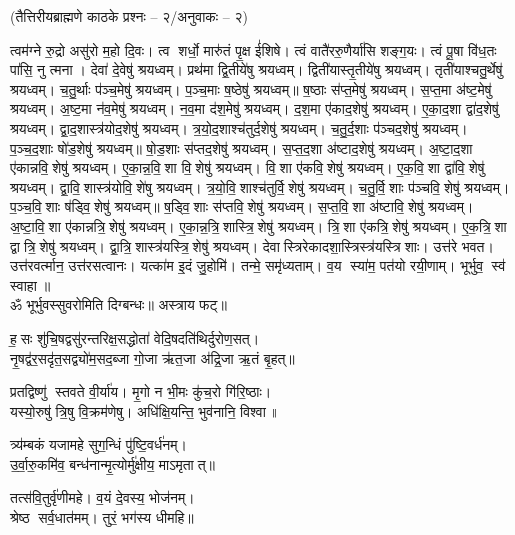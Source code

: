 \centerline{\normalsize (तैत्तिरीयब्राह्मणे काठके प्रश्नः – २/अनुवाकः – २)}
 त्वम॑ग्ने रु॒द्रो असु॑रो म॒हो दि॒वः। त्व शर्धो॒ मारु॑तं पृ॒क्ष ई॑शिषे।
 त्वं वातै॑ररु॒णैर्या॑सि शङ्ग॒यः। त्वं पू॒षा वि॑ध॒तः पा॑सि॒ नु त्मना।
 देवा॑ दे॒वेषु॑ श्रयध्वम्। प्रथ॑मा द्वि॒तीये॑षु श्रयध्वम्।
 द्विती॑यास्तृ॒तीये॑षु श्रयध्वम्। तृती॑याश्चतु॒र्थेषु॑ श्रयध्वम्।
 च॒तु॒र्थाः प॑ञ्च॒मेषु॑ श्रयध्वम्। प॒ञ्च॒माः ष॒ष्ठेषु॑ श्रयध्वम्॥
 ष॒ष्ठाः स॑प्त॒मेषु॑ श्रयध्वम्। स॒प्त॒मा अ॑ष्ट॒मेषु॑ श्रयध्वम्।
 अ॒ष्ट॒मा न॑व॒मेषु॑ श्रयध्वम्। न॒व॒मा द॑श॒मेषु॑ श्रयध्वम्।
 द॒श॒मा ए॑काद॒शेषु॑ श्रयध्वम्। ए॒का॒द॒शा द्वा॑द॒शेषु॑ श्रयध्वम्।
 द्वा॒द॒शास्त्र॑योद॒शेषु॑ श्रयध्वम्। त्र॒यो॒द॒शाश्च॑तुर्द॒शेषु॑ श्रयध्वम्।
 च॒तु॒र्द॒शाः प॑ञ्चद॒शेषु॑ श्रयध्वम्। प॒ञ्च॒द॒शाः षो॑ड॒शेषु॑ श्रयध्वम्॥
 षो॒ड॒शाः स॑प्तद॒शेषु॑ श्रयध्वम्। स॒प्त॒द॒शा अ॑ष्टाद॒शेषु॑ श्रयध्वम्। अ॒ष्टा॒द॒शा ए॑कान्नवि॒शेषु॑ श्रयध्वम्। ए॒का॒न्न॒वि॒शा वि॒शेषु॑ श्रयध्वम्। वि॒शा ए॑कवि॒शेषु॑ श्रयध्वम्। ए॒क॒वि॒शा द्वा॑वि॒शेषु॑ श्रयध्वम्। द्वा॒वि॒शास्त्र॑योवि॒शे॑षु श्रयध्वम्। त्र॒यो॒वि॒शाश्च॑तुर्वि॒शेषु॑ श्रयध्वम्। च॒तु॒र्वि॒शाः प॑ञ्चवि॒शेषु॑ श्रयध्वम्। प॒ञ्च॒वि॒शाः ष॑ड्वि॒शेषु॑ श्रयध्वम्॥
 ष॒ड्वि॒शाः स॑प्तवि॒शेषु॑ श्रयध्वम्। स॒प्त॒वि॒शा अ॑ष्टावि॒शेषु॑ श्रयध्वम्।
 अ॒ष्टा॒वि॒शा ए॑कान्नत्रि॒शेषु॑ श्रयध्वम्। ए॒का॒न्न॒त्रि॒शास्त्रि॒शेषु॑ श्रयध्वम्।
 त्रि॒शा ए॑कत्रि॒शेषु॑ श्रयध्वम्। ए॒क॒त्रि॒शा द्वात्रि॒शेषु॑ श्रयध्वम्।
 द्वा॒त्रि॒शास्त्र॑यस्त्रि॒शेषु॑ श्रयध्वम्। देवास्त्रिरेकादशा॒स्त्रिस्त्र॑यस्त्रिशाः।
 उत्त॑रे भवत। उत्त॑रवर्त्मान॒ उत्त॑रसत्वानः।
 यत्का॑म इ॒दं जु॒होमि॑। तन्मे॒ समृ॑ध्यताम्।
 व॒य स्या॑म॒ पत॑यो रयी॒णाम्। भूर्भुव॒ स्व॑ स्वाहा॥\\
ॐ भूर्भुवस्सुवरोमिति दिग्बन्धः॥ अस्त्राय फट्॥


ह॒सः शु॑चि॒षद्वसु॑रन्तरिक्ष॒सद्धोता॑ वेदि॒षदति॑थिर्दुरोण॒सत्।\\
नृ॒षद्व॑र॒सदृ॑त॒सद्व्यो॑म॒सद॒ब्जा गो॒जा ऋ॑त॒जा अ॑द्रि॒जा ऋ॒तं बृ॒हत्॥

प्रतद्विष्णु॑ स्तवते वी॒र्या॑य। मृ॒गो न भी॒मः कु॑च॒रो गि॑रि॒ष्ठाः।\\
 यस्यो॒रुषु॑ त्रि॒षु वि॒क्रम॑णेषु। अधि॑क्षि॒यन्ति॒ भुव॑नानि॒ विश्वा॥

 त्र्य॑म्बकं यजामहे सुग॒न्धिं पु॑ष्टि॒वर्ध॑नम्।\\
 उ॒र्वा॒रु॒कमि॑व॒ बन्ध॑नान्मृ॒त्योर्मु॑क्षीय॒ माऽमृतात्॥ 

 तत्स॑वि॒तुर्वृ॑णीमहे। व॒यं दे॒वस्य॒ भोज॑नम्‌।\\
 श्रेष्ठ सर्व॒धात॑मम्‌। तुरं॒ भग॑स्य धीमहि॥ 

